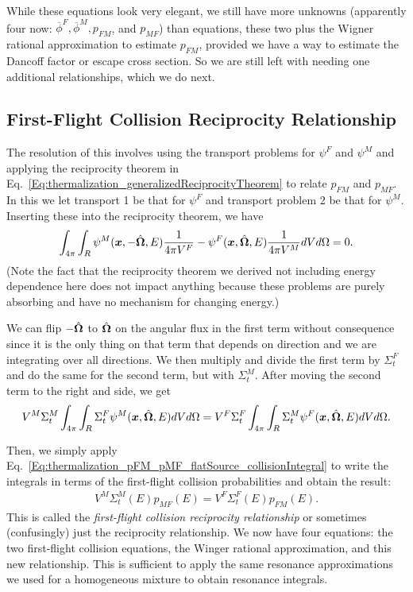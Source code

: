 While these equations look very elegant, we still have more unknowns (apparently four now: $\overline{\phi}^F, \overline{\phi}^M, p_{FM}$, and $p_{MF}$) than equations, these two plus the Wigner rational approximation to estimate $p_{FM}$, provided we have a way to estimate the Dancoff factor or escape cross section. So we are still left with needing one additional relationships, which we do next.

\subsection{First-Flight Collision Reciprocity Relationship}

The resolution of this involves using the transport problems for $\psi^F$ and $\psi^M$ and applying the reciprocity theorem in Eq.~\eqref{Eq:thermalization_generalizedReciprocityTheorem} to relate $p_{FM}$ and $p_{MF}$. In this we let transport 1 be that for $\psi^F$ and transport problem 2 be that for $\psi^M$. Inserting these into the reciprocity theorem, we have
\begin{align}
  \int_{4\pi} \int_R  \psi^M(\bm{x},-\hat{\mathbf{\Omega}},E) \frac{1}{4\pi V^F} - \psi^F(\bm{x},\hat{\mathbf{\Omega}},E) \frac{1}{4\pi V^M} dV d\Omega = 0.
\end{align}
(Note the fact that the reciprocity theorem we derived not including energy dependence here does not impact anything because these problems are purely absorbing and have no mechanism for changing energy.) 

We can flip $-\hat{\mathbf{\Omega}}$ to $\hat{\mathbf{\Omega}}$ on the angular flux in the first term without consequence since it is the only thing on that term that depends on direction and we are integrating over all directions. We then multiply and divide the first term by $\Sigma_t^F$ and do the same for the second term, but with $\Sigma_t^M$. After moving the second term to the right and side, we get
\begin{align}
  V^M \Sigma_t^M \int_{4\pi} \int_R \Sigma_t^F \psi^M(\bm{x},\hat{\mathbf{\Omega}},E) dV d\Omega  = V^F \Sigma_t^F \int_{4\pi} \int_R \Sigma_t^M \psi^F(\bm{x},\hat{\mathbf{\Omega}},E)  dV d\Omega .
\end{align}

Then, we simply apply Eq.~\eqref{Eq:thermalization_pFM_pMF_flatSource_collisionIntegral} to write the integrals in terms of the first-flight collision probabilities and obtain the result:
\begin{align}
  V^M \Sigma_t^M(E)  p_{MF}(E)  = V^F \Sigma_t^F(E) p_{FM}(E). \label{Eq:thermalization_firstFlightCollisionReciprocityRelationship}
\end{align}
This is called the \emph{first-flight collision reciprocity relationship} or sometimes (confusingly) just the reciprocity relationship. We now have four equations: the two first-flight collision equations, the Winger rational approximation, and this new relationship. This is sufficient to apply the same resonance approximations we used for a homogeneous mixture to obtain resonance integrals. 

